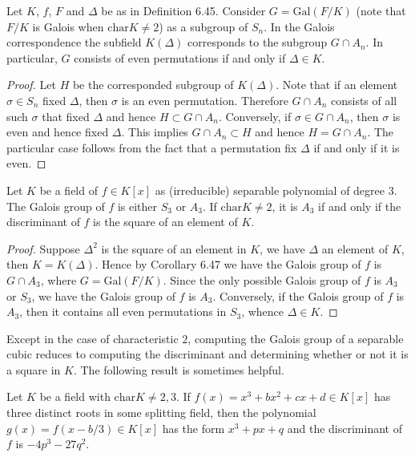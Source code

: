 \begin{corollary}
Let $K$, $f$, $F$ and $\Delta$ be as in Definition 6.45. Consider $G=\mathrm{Gal}(F/K)$ (note that $F/K$ is Galois when $\mathrm{char}K\ne 2$) as a subgroup of $S_n$. In the Galois correspondence the subfield $K(\Delta)$ corresponds to the subgroup $G\cap A_n$. In particular, $G$ consists of even permutations if and only if $\Delta\in K$.
\end{corollary}
\begin{proof}
Let $H$ be the corresponded subgroup of $K(\Delta)$. Note that if an element $\sigma\in S_n$ fixed $\Delta$, then $\sigma$ is an even permutation. Therefore $G\cap A_n$ consists of all such $\sigma$ that fixed $\Delta$ and hence $H\subset G\cap A_n$. Conversely, if $\sigma\in G\cap A_n$, then $\sigma$ is even and hence fixed $\Delta$. This implies $G\cap A_n\subset H$ and hence $H=G\cap A_n$. The particular case follows from the fact that a permutation fix $\Delta$ if and only if it is even.
\end{proof}
\begin{corollary}
Let $K$ be a field of $f\in K[x]$ as (irreducible) separable polynomial of degree $3$. The Galois group of $f$ is either $S_3$ or $A_3$. If $\mathrm{char}K\ne 2$, it is $A_3$ if and only if the discriminant of $f$ is the square of an element of $K$.
\end{corollary}
\begin{proof}
Suppose $\Delta^2$ is the square of an element in $K$, we have $\Delta$ an element of $K$, then $K=K(\Delta)$. Hence by Corollary 6.47 we have the Galois group of $f$ is $G\cap A_3$, where $G=\mathrm{Gal}(F/K)$. Since the only possible Galois group of $f$ is $A_3$ or $S_3$, we have the Galois group of $f$ is $A_3$. Conversely, if the Galois group of $f$ is $A_3$, then it contains all even permutations in $S_3$, whence $\Delta\in K$.
\end{proof}
Except in the case of characteristic $2$, computing the Galois group of a separable cubic reduces to computing the discriminant and determining whether or not it is a square in $K$. The following result is sometimes helpful.
\begin{proposition}
Let $K$ be a field with $\mathrm{char}K\ne 2,3$. If $f(x)=x^3+bx^2+cx+d\in K[x]$ has three distinct roots in some splitting field, then the polynomial $g(x)=f(x-b/3)\in K[x]$ has the form $x^3+px+q$ and the discriminant of $f$ is $-4p^3-27q^2$.
\end{proposition}
